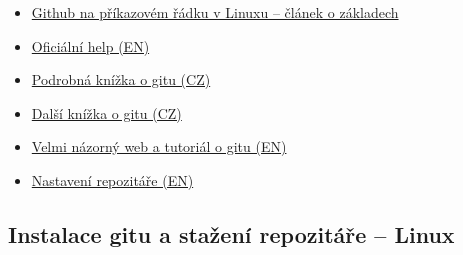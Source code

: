 \begin{itemize}
	\item \href{http://www.kutac.cz/blog/pocitace-a-internety/jak-na-git-dil-1/}{Github na příkazovém řádku v Linuxu -- článek o základech}
	\item \href{https://help.github.com}{Oficiální help (EN)}
	\item \href{https://knihy.nic.cz/files/edice/pro_git.pdf}{Podrobná knížka o gitu (CZ)}
	\item \href{https://git-scm.com/book/cs/v1/\%C3\%9Avod}{Další knížka o gitu (CZ)}
	\item \href{https://learngitbranching.js.org/}{Velmi názorný web a tutoriál o gitu (EN) }
	\item \href{https://www.atlassian.com/git/tutorials/setting-up-a-repository}{Nastavení repozitáře (EN)}
	
	
\end{itemize}




\subsection{Instalace gitu a stažení repozitáře -- Linux} \label{instal_github}


